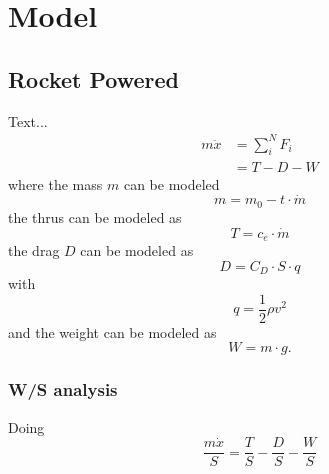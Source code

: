 \section{Model}

\subsection{Rocket Powered}
Text...
\begin{equation}
\begin{split}
	m\ddot{x} &= \sum_i^N F_i \\
	&= T - D - W
\end{split}
\end{equation}
where the mass $m$ can be modeled
\begin{equation}
	m = m_0 - t \cdot \dot{m}
\end{equation}
the thrus can be modeled as
\begin{equation}
	T = c_e \cdot \dot{m}
\end{equation}
the drag $D$ can be modeled as
\begin{equation}
	D = C_D \cdot S \cdot q
\end{equation}
with
\begin{equation}
	q = \frac{1}{2} \rho v^2
\end{equation}
and the weight can be modeled as
\begin{equation}
	W = m \cdot g.
\end{equation}

\subsubsection{W/S analysis}
Doing
\begin{equation}
	\frac{m \dot{x}}{S} = \frac{T}{S} - \frac{D}{S} - \frac{W}{S}
\end{equation}

